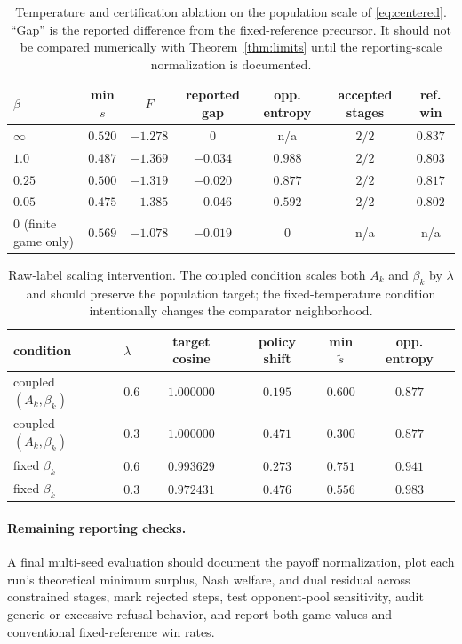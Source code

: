 \documentclass{article}
\theoremstyle{remark}
\theoremstyle{plain}
\begin{document}
\begin{table}[htbp]
\centering\footnotesize
\setlength{\tabcolsep}{2.5pt}
\caption{Temperature and certification ablation on the population scale of \eqref{eq:centered}. ``Gap'' is the reported difference from the fixed-reference precursor. It should not be compared numerically with Theorem~\ref{thm:limits} until the reporting-scale normalization is documented.}
\label{tab:beta-ablation}
\begin{tabular}{lcccccc}
\toprule
$\beta$ & min $s$ & $F$ & reported gap & opp. entropy & accepted stages & ref. win\\
\midrule
$\infty$ & $0.520$ & $-1.278$ & $0$ & n/a & $2/2$ & $0.837$\\
$1.0$ & $0.487$ & $-1.369$ & $-0.034$ & $0.988$ & $2/2$ & $0.803$\\
$0.25$ & $0.500$ & $-1.319$ & $-0.020$ & $0.877$ & $2/2$ & $0.817$\\
$0.05$ & $0.475$ & $-1.385$ & $-0.046$ & $0.592$ & $2/2$ & $0.802$\\
$0$ (finite game only) & $0.569$ & $-1.078$ & $-0.019$ & $0$ & n/a & n/a\\
\bottomrule
\end{tabular}
\end{table}

\begin{table}[htbp]
\centering\footnotesize
\caption{Raw-label scaling intervention. The coupled condition scales both $A_k$ and $\beta_k$ by $\lambda$ and should preserve the population target; the fixed-temperature condition intentionally changes the comparator neighborhood.}
\label{tab:scale-intervention}
\begin{tabular}{llcccc}
\toprule
condition & $\lambda$ & target cosine & policy shift & min $\widetilde s$ & opp. entropy\\
\midrule
coupled $(A_k,\beta_k)$ & $0.6$ & $1.000000$ & $0.195$ & $0.600$ & $0.877$\\
coupled $(A_k,\beta_k)$ & $0.3$ & $1.000000$ & $0.471$ & $0.300$ & $0.877$\\
fixed $\beta_k$ & $0.6$ & $0.993629$ & $0.273$ & $0.751$ & $0.941$\\
fixed $\beta_k$ & $0.3$ & $0.972431$ & $0.476$ & $0.556$ & $0.983$\\
\bottomrule
\end{tabular}
\end{table}

\paragraph{Remaining reporting checks.} A final multi-seed evaluation should document the payoff normalization, plot each run's theoretical minimum surplus, Nash welfare, and dual residual across constrained stages, mark rejected steps, test opponent-pool sensitivity, audit generic or excessive-refusal behavior, and report both game values and conventional fixed-reference win rates.
\end{document}
